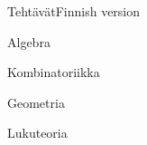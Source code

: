 \documentclass[11pt]{article}
\begin{document}
   \begin{bwExam}{Tehtävät}{Finnish version}
    \begin{bwExamBlock}{Algebra}
      
    \end{bwExamBlock}
    \begin{bwExamBlock}{Kombinatoriikka}
      
    \end{bwExamBlock}
\goodbreak
    \begin{bwExamBlock}{Geometria}
      
    \end{bwExamBlock}
    \begin{bwExamBlock}{Lukuteoria}
      
    \end{bwExamBlock}
  \end{bwExam}
\end{document}
